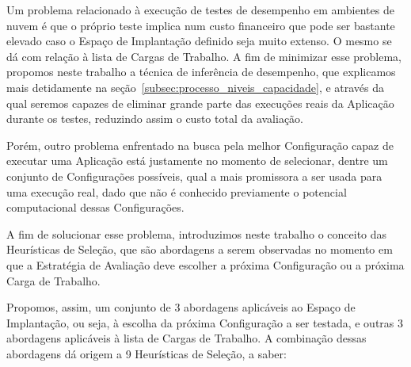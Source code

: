 Um problema relacionado à execução de testes de desempenho em ambientes de nuvem
é que o próprio teste implica num custo financeiro que pode ser bastante elevado
caso o Espaço de Implantação definido seja muito extenso. O mesmo se dá com 
relação à lista de Cargas de Trabalho. A fim de minimizar esse problema, propomos 
neste trabalho a técnica de inferência de desempenho, que explicamos mais detidamente 
na seção~\ref{subsec:processo_niveis_capacidade}, e através da qual seremos capazes
de eliminar grande parte das execuções reais da Aplicação durante os testes, 
reduzindo assim o custo total da avaliação. 

Porém, outro problema enfrentado na busca pela melhor Configuração capaz de executar 
uma Aplicação está justamente no momento de selecionar, dentre um conjunto de 
Configurações possíveis, qual a mais promissora a ser usada para uma execução real, 
dado que não é conhecido previamente o potencial computacional dessas Configurações.

A fim de solucionar esse problema, introduzimos neste trabalho o conceito das 
Heurísticas de Seleção, que são abordagens a serem observadas no momento em que
a Estratégia de Avaliação deve escolher a próxima Configuração ou a próxima Carga 
de Trabalho. 

Propomos, assim, um conjunto de 3 abordagens aplicáveis ao Espaço de Implantação,
ou seja, à escolha da próxima Configuração a ser testada, e outras 3 abordagens
aplicáveis à lista de Cargas de Trabalho. A combinação dessas abordagens dá origem
a 9 Heurísticas de Seleção, a saber:

